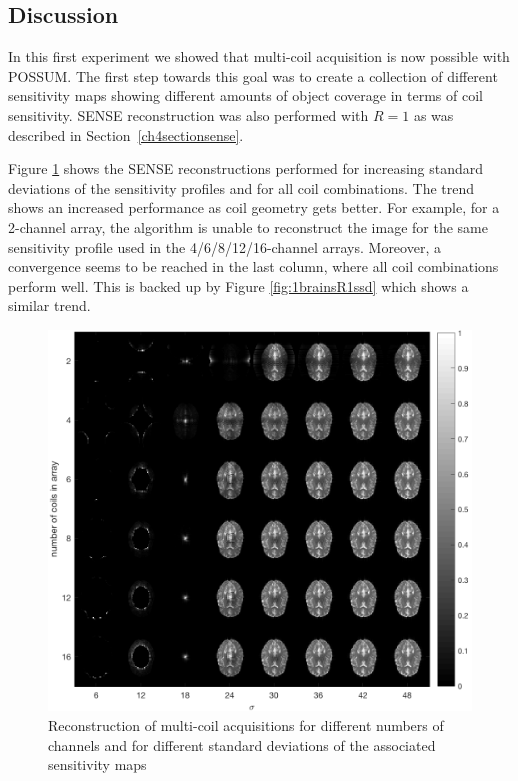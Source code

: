 \subsection{Discussion}
In this first experiment we showed that multi-coil acquisition is now possible with POSSUM. The first step towards this goal was to create a collection of different sensitivity maps showing different amounts of object coverage in terms of coil sensitivity. SENSE reconstruction was also performed with $R = 1$ as was described in Section~\ref{ch4sectionsense}. 

Figure \ref{fig:1brainsR1rec} shows the SENSE reconstructions performed for increasing standard deviations of the sensitivity profiles and for all coil combinations. The trend shows an increased performance as coil geometry gets better. For example, for a 2-channel array, the algorithm is unable to reconstruct the image for the same sensitivity profile used in the 4/6/8/12/16-channel arrays. Moreover, a convergence seems to be reached in the last column, where all coil combinations perform well. This is backed up by Figure \ref{fig:1brainsR1ssd} which shows a similar trend. 

\begin{figure}[H]
    \centering
    \includegraphics[width=1\textwidth,keepaspectratio]{1brainsR1rec}
    \caption{Reconstruction of multi-coil acquisitions for different numbers of channels and for different standard deviations of the associated sensitivity maps}
    \label{fig:1brainsR1rec}
\end{figure}

